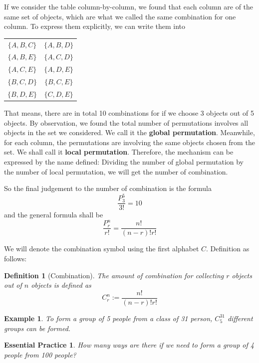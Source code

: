 \documentclass[12pt]{article}
\newtheorem{definition}{Definition}[section]
\newtheorem*{example}{Example}
\newtheorem{exercise}{Essential Practice}[subsection]
\begin{document}
    If we consider the table column-by-column, we found that each column are of the same set of objects, which are what we called the same combination for one column. To express them explicitly, we can write them into

    \begin{center}
        \begin{tabular}{c c}
            $\{A,B,C\}$&$\{A,B,D\}$\\
            $\{A,B,E\}$&$\{A,C,D\}$\\
            $\{A,C,E\}$&$\{A,D,E\}$\\
            $\{B,C,D\}$&$\{B,C,E\}$\\
            $\{B,D,E\}$&$\{C,D,E\}$
        \end{tabular}
    \end{center}

    That means, there are in total 10 combinations for if we choose 3 objects out of 5 objects. By observation, we found the total number of permutations involves all objects in the set we considered. We call it the \textbf{global permutation}. Meanwhile, for each column, the permutations are involving the same objects chosen from the set. We shall call it \textbf{local permutation}. Therefore, the mechanism can be expressed by the name defined: Dividing the number of global permutation by the number of local permutation, we will get the number of combination.

    So the final judgement to the number of combination is the formula $$\frac{P_3^5}{3!}=10$$ and the general formula shall be $$\frac{P_r^n}{r!}=\frac{n!}{(n-r)!r!}$$

    We will denote the combination symbol using the first alphabet $C$. Definition as follows:

    \begin{definition}[Combination]
        The amount of combination for collecting $r$ objects out of $n$ objects is defined as $$C_r^n:=\frac{n!}{(n-r)!r!}$$
    \end{definition}

    \begin{example}
        To form a group of 5 people from a class of 31 person, $C_5^{31}$ different groups can be formed.
    \end{example}

    \begin{exercise}
        How many ways are there if we need to form a group of 4 people from 100 people?
    \end{exercise}
\end{document}
